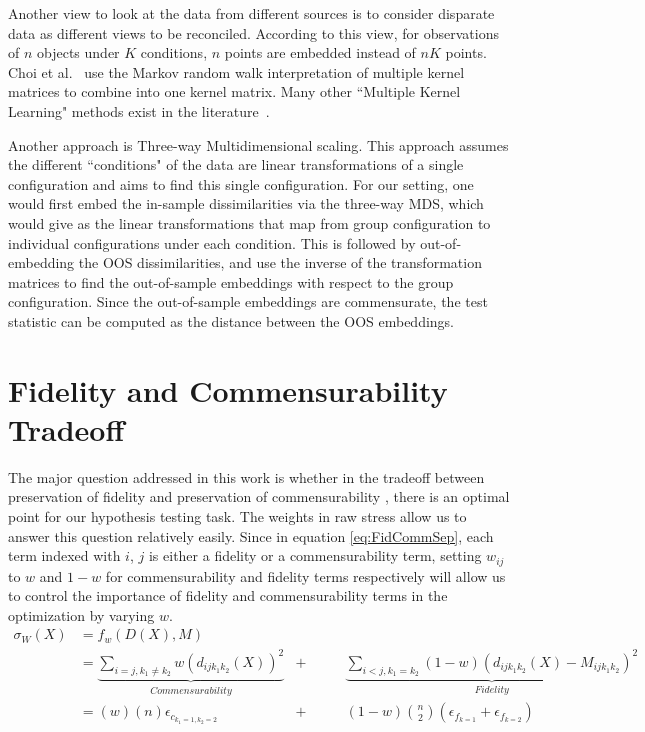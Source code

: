 \documentclass[11pt]{article} %
\begin{document}
Another view to look at the data from different sources is to consider disparate data as different views to be reconciled. According to this view, for observations of $n$ objects under $K$ conditions, $n$ points are embedded instead of $nK$ points. Choi et al.\ \cite{Choi:2008:MIM:1619995.1620064} use the Markov random walk interpretation of multiple kernel matrices to combine into one kernel matrix.  Many other ``Multiple Kernel Learning"  methods exist in the literature~\cite{McFee:2011:LMS:1953048.1953063,Lin2009,Lanckriet2004}.

Another approach is Three-way Multidimensional scaling\cite{3wayNMDS,borg+groenen:1997}.
 This approach assumes the  different ``conditions" of the data are linear transformations of a single configuration and aims to find this single configuration. For our setting, one would first embed the in-sample dissimilarities via the three-way MDS, which would give as the linear transformations that map from group configuration to individual configurations under each condition. This is followed by out-of-embedding the OOS dissimilarities, and use the inverse of the transformation matrices to find the out-of-sample embeddings with respect to the group configuration. Since the out-of-sample embeddings are commensurate, the test statistic can be computed as the distance between the OOS embeddings. 



\section{Fidelity and Commensurability Tradeoff}
The major question  addressed in this work is whether in the tradeoff between preservation of fidelity and preservation of  commensurability , there is an optimal point for our hypothesis testing task.  The weights in raw stress allow us to answer this question relatively easily. Since in equation \eqref{eq:FidCommSep},  each term indexed with $i$, $j$ is either a fidelity or a commensurability term, setting $w_{ij}$ to $w$ and $1-w$  for commensurability  and fidelity  terms respectively will allow us to control the importance of fidelity and commensurability terms in the optimization by varying $w$. 
\begin{align*}
\sigma_W(X)&=  f_w(D(X),M) & &\\
&=  \underbrace{\sum_{i=j,k_1\neq k_2}  {w(d_{ij{k_1}{k_2}}(X))^2}}_{Commensurability} & +\hspace{2em} & \underbrace{\sum_{i<j,k_1=k_2}  {(1-w)(d_{ij{k_1}{k_2}}(X)-M_{ijk_1k_2})^2  }  } _{Fidelity}\\
&=  \left(w\right)\left(n\right) \epsilon_{c_{k_1=1,k_2=2}} & +\hspace{2em} & (1-w){{n}\choose{2}} ( \epsilon_{f_{k=1}}+\epsilon_{f_{k=2}} )
\end{align*}
\end{document}
